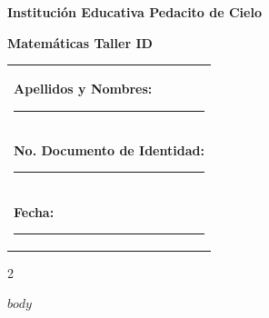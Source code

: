 \documentclass[10pt]{article}
\makeatletter
\newcommand{\myID}{\@ID}
\newcommand{\myDate}{\@Date}
\makeatother
\begin{document}
\thispagestyle{empty}
{\sf
\textbf{\LARGE{Institución Educativa Pedacito de Cielo}}

\textbf{\large{Matemáticas \myDate \hfill Taller ID \myID}}

\vspace*{1.5cm}

\begin{tabular}{p{14cm}}
\textbf{Apellidos y Nombres:} \hrule \\[1.2cm]
\textbf{No. Documento de Identidad:} \hrule \\[1.2cm]
\textbf{Fecha:} \hrule  \\[1.2cm]
\end{tabular}

\vspace*{0.5cm}

}
\newpage

\begin{multicols}{2}

$body$

\end{multicols}
\end{document}
